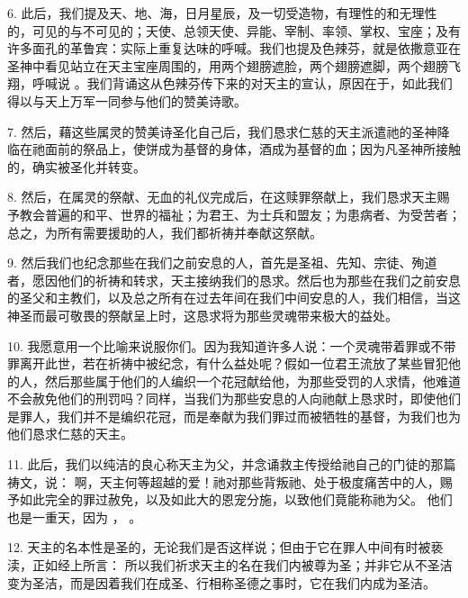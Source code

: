 6. 此后，我们提及天、地、海，日月星辰，及一切受造物，有理性的和无理性的，可见的与不可见的；天使、总领天使、异能、宰制、率领、掌权、宝座；及有许多面孔的革鲁宾：实际上重复达味的呼喊。我们也提及色辣芬，就是依撒意亚在圣神中看见站立在天主宝座周围的，用两个翅膀遮脸，两个翅膀遮脚，两个翅膀飞翔，呼喊说 。我们背诵这从色辣芬传下来的对天主的宣认，原因在于，如此我们得以与天上万军一同参与他们的赞美诗歌。\par

7. 然后，藉这些属灵的赞美诗圣化自己后，我们恳求仁慈的天主派遣祂的圣神降临在祂面前的祭品上，使饼成为基督的身体，酒成为基督的血；因为凡圣神所接触的，确实被圣化并转变。\par

8. 然后，在属灵的祭献、无血的礼仪完成后，在这赎罪祭献上，我们恳求天主赐予教会普遍的和平、世界的福祉；为君王、为士兵和盟友；为患病者、为受苦者；总之，为所有需要援助的人，我们都祈祷并奉献这祭献。\par

9. 然后我们也纪念那些在我们之前安息的人，首先是圣祖、先知、宗徒、殉道者，愿因他们的祈祷和转求，天主接纳我们的恳求。然后也为那些在我们之前安息的圣父和主教们，以及总之所有在过去年间在我们中间安息的人，我们相信，当这神圣而最可敬畏的祭献呈上时，这恳求将为那些灵魂带来极大的益处。\par

10. 我愿意用一个比喻来说服你们。因为我知道许多人说：一个灵魂带着罪或不带罪离开此世，若在祈祷中被纪念，有什么益处呢？假如一位君王流放了某些冒犯他的人，然后那些属于他们的人编织一个花冠献给他，为那些受罚的人求情，他难道不会赦免他们的刑罚吗？同样，当我们为那些安息的人向祂献上恳求时，即使他们是罪人，我们并不是编织花冠，而是奉献为我们罪过而被牺牲的基督，为我们也为他们恳求仁慈的天主。\par

11. 此后，我们以纯洁的良心称天主为父，并念诵救主传授给祂自己的门徒的那篇祷文，说： 啊，天主何等超越的爱！祂对那些背叛祂、处于极度痛苦中的人，赐予如此完全的罪过赦免，以及如此大的恩宠分施，以致他们竟能称祂为父。 他们也是一重天，因为  ， 。\par

12.  天主的名本性是圣的，无论我们是否这样说；但由于它在罪人中间有时被亵渎，正如经上所言： 所以我们祈求天主的名在我们内被尊为圣；并非它从不圣洁变为圣洁，而是因着我们在成圣、行相称圣德之事时，它在我们内成为圣洁。\par

